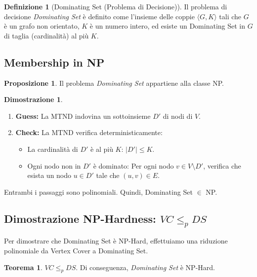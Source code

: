 \documentclass[a4paper]{article}
\theoremstyle{definition} %
\newtheorem{theorem}{Teorema}
[section]
\newtheorem{definition}{Definizione}[section]
\newtheorem{proposition}{Proposizione}[section]
\theoremstyle{definition} %
\newtheorem*{proof*}{Dimostrazione}
\begin{document}
\begin{definition}[Dominating Set (Problema di Decisione)]
Il problema di decisione \emph{Dominating Set} è definito come l'insieme delle coppie $\langle G, K \rangle$ tali che $G$ è un grafo non orientato, $K$ è un numero intero, ed esiste un Dominating Set in $G$ di taglia (cardinalità) al più $K$.
\end{definition}

\subsection{Membership in NP}

\begin{proposition}
Il problema \emph{Dominating Set} appartiene alla classe NP.
\end{proposition}

\begin{proof*}
\begin{enumerate}
    \item \textbf{Guess:} La MTND indovina un sottoinsieme $D'$ di nodi di $V$.
    \item \textbf{Check:} La MTND verifica deterministicamente:
    \begin{itemize}
        \item La cardinalità di $D'$ è al più $K$: $|D'| \le K$.
        \item Ogni nodo non in $D'$ è dominato: Per ogni nodo $v \in V \setminus D'$, verifica che esista un nodo $u \in D'$ tale che $(u, v) \in E$.
    \end{itemize}
\end{enumerate}
Entrambi i passaggi sono polinomiali. Quindi, Dominating Set $\in$ NP.
\end{proof*}

\subsection{Dimostrazione NP-Hardness: $VC \le_p DS$}

Per dimostrare che Dominating Set è NP-Hard, effettuiamo una riduzione polinomiale da Vertex Cover a Dominating Set.

\begin{theorem}
$VC \le_p DS$. Di conseguenza, \emph{Dominating Set} è NP-Hard.
\end{theorem}
\end{document}
